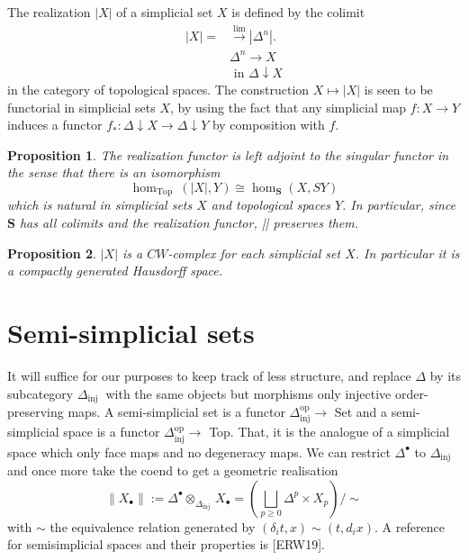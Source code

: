 \documentclass{book}
\newtheorem{prop}{Proposition}
\begin{document}
The realization $|X|$ of a simplicial set $X$ is defined by the colimit
$$
\begin{aligned}
|X|= & \xrightarrow{\lim }\left|\Delta^n\right| . \\
& \Delta^n \rightarrow X \\
& \text { in } \Delta \downarrow X
\end{aligned}
$$
in the category of topological spaces. The construction $X \mapsto|X|$ is seen to be functorial in simplicial sets $X$, by using the fact that any simplicial map $f: X \rightarrow Y$ induces a functor $f_*: \Delta \downarrow X \rightarrow \Delta \downarrow Y$ by composition with $f$.

\begin{prop}
    The realization functor is left adjoint to the singular functor in the sense that there is an isomorphism
$$
\operatorname{hom}_{\text {Top }}(|X|, Y) \cong \operatorname{hom}_{\mathbf{S}}(X, S Y)
$$
which is natural in simplicial sets $X$ and topological spaces $Y$. In particular, since $\mathbf{S}$ has all colimits and the realization functor, || preserves them.
\end{prop} 

\begin{prop}
    $|X|$ is a $C W$-complex for each simplicial set $X$. In particular it is a compactly generated Hausdorff space.
\end{prop}

\section{Semi-simplicial sets}

It will suffice for our purposes to keep track of less structure, and replace $\Delta$ by its subcategory $\Delta_{\text {inj }}$ with the same objects but morphisms only injective order-preserving maps. A semi-simplicial set is a functor $\Delta_{\mathrm{inj}}^{\mathrm{op}} \rightarrow$ Set and a semi-simplicial space is a functor $\Delta_{\mathrm{inj}}^{\mathrm{op}} \rightarrow$ Top. That, it is the analogue of a simplicial space which only face maps and no degeneracy maps. We can restrict $\Delta^{\bullet}$ to $\Delta_{\text {inj }}$ and once more take the coend to get a geometric realisation
$$
\left\|X_{\bullet}\right\|:=\Delta^{\bullet} \otimes_{\Delta_{\text {inj }}} X_{\bullet}=\left(\bigsqcup_{p \geq 0} \Delta^p \times X_p\right) / \sim
$$
with $\sim$ the equivalence relation generated by $\left(\delta_i t, x\right) \sim\left(t, d_i x\right)$. A reference for semisimplicial spaces and their properties is [ERW19].
\end{document}
